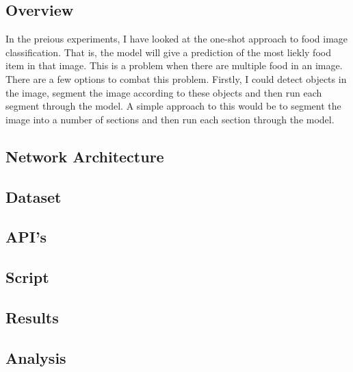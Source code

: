 \subsection*{Overview}
In the preious experiments, I have looked at the one-shot approach to food image
classification. That is, the model will give a prediction of the most liekly
food item in that image. This is a problem when there are multiple food in an
image. There are a few options to combat this problem. Firstly, I could detect
objects in the image, segment the image according to these objects and then run
each segment through the model. A simple approach to this would be to segment
the image into a number of sections and then run each section through the model.

\subsection*{Network Architecture}
\subsection*{Dataset}
\subsection*{API's}
\subsection*{Script}
\subsection*{Results}
\subsection*{Analysis}
